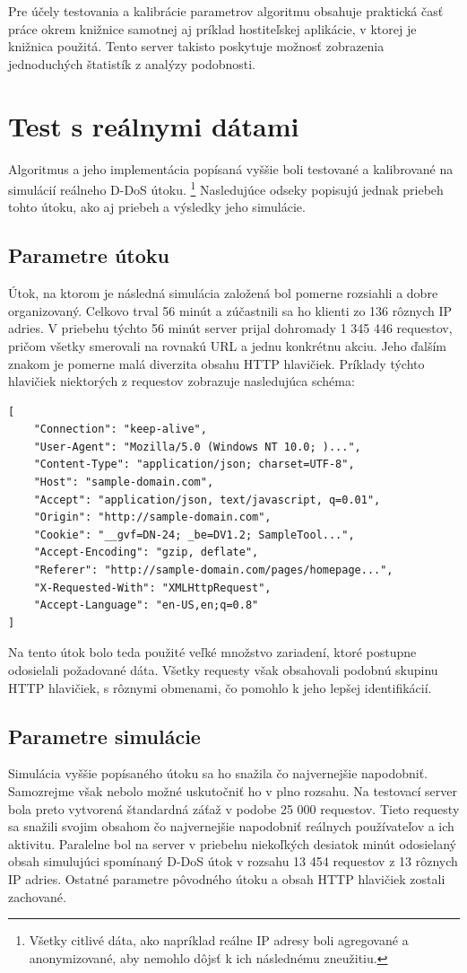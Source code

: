 \documentclass[
  digital, %
  table,   %
  lof,     %
  nolot,   %
  nocover
]{fithesis3}
\begin{document}
Pre účely testovania a kalibrácie parametrov algoritmu obsahuje praktická časť práce okrem
knižnice samotnej aj príklad hostiteľskej aplikácie, v ktorej je knižnica
použitá. Tento server takisto poskytuje možnosť zobrazenia jednoduchých
štatistík z analýzy podobnosti.

\chapter{Test s reálnymi dátami}
\label{ch:data}
Algoritmus a jeho implementácia popísaná vyššie boli testované a kalibrované na
simulácií reálneho D-DoS útoku. \footnote{Všetky citlivé dáta, ako napríklad reálne IP
adresy boli agregované a anonymizované, aby nemohlo dôjsť k ich následnému
zneužitiu.} Nasledujúce odseky popisujú jednak priebeh tohto
útoku, ako aj priebeh a výsledky jeho simulácie. 

\section{Parametre útoku}
Útok, na ktorom je následná simulácia založená bol pomerne rozsiahli a dobre
organizovaný. Celkovo trval 56 minút a zúčastnili sa ho klienti zo 136 rôznych
IP adries. V priebehu týchto 56 minút server prijal dohromady 1 345 446 requestov, pričom
všetky smerovali na rovnakú URL a jednu konkrétnu akciu. Jeho ďalším znakom je
pomerne malá diverzita obsahu HTTP hlavičiek. Príklady týchto hlavičiek
niektorých z requestov zobrazuje nasledujúca schéma: 

\begin{lstlisting}[basicstyle=\footnotesize, mathescape=true]
[
    "Connection": "keep-alive",
    "User-Agent": "Mozilla/5.0 (Windows NT 10.0; )...",
    "Content-Type": "application/json; charset=UTF-8",
    "Host": "sample-domain.com",
    "Accept": "application/json, text/javascript, q=0.01",
    "Origin": "http://sample-domain.com",
    "Cookie": "__gvf=DN-24; _be=DV1.2; SampleTool...",
    "Accept-Encoding": "gzip, deflate",
    "Referer": "http://sample-domain.com/pages/homepage...",
    "X-Requested-With": "XMLHttpRequest",
    "Accept-Language": "en-US,en;q=0.8"
]
\end{lstlisting}

Na tento útok bolo teda použité veľké množstvo zariadení, ktoré postupne
odosielali požadované dáta. Všetky requesty však obsahovali podobnú skupinu
HTTP hlavičiek, s rôznymi obmenami, čo pomohlo k jeho lepšej identifikácií.

\section{Parametre simulácie}
Simulácia vyššie popísaného útoku sa ho snažila čo najvernejšie napodobniť.
Samozrejme však nebolo možné uskutočniť ho v plno rozsahu. Na testovací server
bola preto vytvorená štandardná záťaž v podobe 25 000 requestov. Tieto requesty
sa snažili svojim obsahom čo najvernejšie napodobniť reálnych používateľov a
ich aktivitu. Paralelne bol na server  v priebehu niekoľkých desiatok minút
odosielaný obsah simulujúci spomínaný D-DoS útok v rozsahu 13 454 requestov z
13 rôznych IP adries. Ostatné parametre pôvodného útoku a obsah HTTP hlavičiek
zostali zachované.
\end{document}

